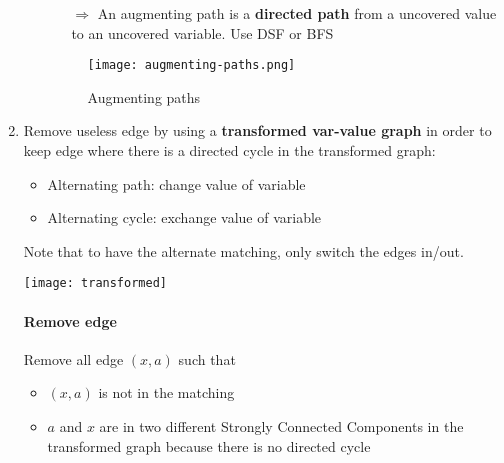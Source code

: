\begin{enumerate}
\begin{enumerate}
\begin{itemize}
                    \item[$\Rightarrow$] An augmenting path is a \textbf{directed path}
                        from a uncovered value to an uncovered variable.
                        Use DSF or BFS
                \end{itemize}

                \begin{figure}[!h]
                    \centering
                    \texttt{[image: augmenting-paths.png]}
                    \caption{Augmenting paths}
                \end{figure}

        \end{enumerate}

    \item Remove useless edge by using a \textbf{transformed var-value
        graph} in order to keep edge where there is a directed
        cycle in the transformed graph:
        \begin{itemize}
            \item Alternating path: change value of variable
            \item Alternating cycle: exchange value of variable
        \end{itemize}

        Note that to have the alternate matching, only switch the
        edges in/out.

        \begin{center}
            \texttt{[image: transformed]}
        \end{center}

        \paragraph{Remove edge}
        Remove all edge $(x, a)$ such that 
        \begin{itemize}
            \item $(x, a)$ is not in the matching 
            \item $a$ and $x$ are in two different Strongly
                Connected Components in the transformed graph because
                there is no directed cycle 
        \end{itemize}


\end{enumerate}


